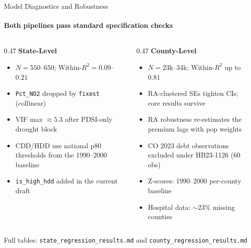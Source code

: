 \documentclass[aspectratio=169,11pt]{beamer}
\newcommand{\tealtext}[1]{{\color{Teal}#1}}
\newcommand{\graytext}[1]{{\color{WarmGray}#1}}
\begin{document}
\begin{frame}{Model Diagnostics and Robustness}
  \framesubtitle{Both pipelines pass standard specification checks}
  \begin{columns}[T]
    \begin{column}{0.47\textwidth}
      \textbf{\tealtext{State-Level}}\\[-0.1em]
      \footnotesize
      \begin{itemize}\itemsep0.14em
        \item $N = 550$--$650$; Within-$R^2 = 0.09$--$0.21$
        \item \texttt{Pct\_NO2} dropped by \texttt{fixest} (collinear)
        \item VIF max $\approx 5.3$ after PDSI-only drought block
        \item CDD/HDD use national p80 thresholds from the 1990--2000 baseline
        \item \texttt{is\_high\_hdd} added in the current draft
      \end{itemize}
    \end{column}
    \begin{column}{0.47\textwidth}
      \textbf{\tealtext{County-Level}}\\[-0.1em]
      \footnotesize
      \begin{itemize}\itemsep0.14em
        \item $N = 23$k--$34$k; Within-$R^2$ up to $0.81$
        \item RA-clustered SEs tighten CIs; core results survive
        \item RA robustness re-estimates the premium lags with pop weights
        \item CO 2023 debt observations excluded under HB23-1126 (60 obs)
        \item Z-scores: 1990--2000 per-county baseline
        \item Hospital data: $\sim$23\% missing counties
      \end{itemize}
    \end{column}
  \end{columns}
  \vspace{0.2em}
  \begin{center}
    \graytext{\scriptsize Full tables: \texttt{state\_regression\_results.md} and \texttt{county\_regression\_results.md}}
  \end{center}
\end{frame}
\end{document}
